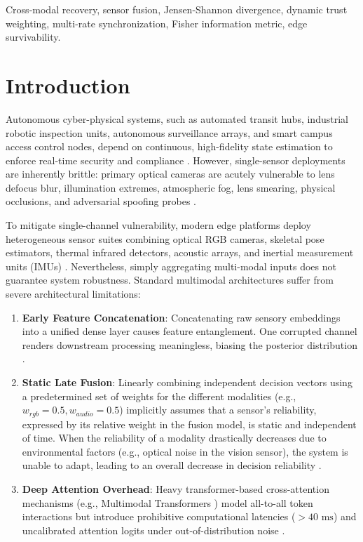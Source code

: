 \documentclass[conference]{IEEEtran}
\begin{document}
\begin{IEEEkeywords}
Cross-modal recovery, sensor fusion, Jensen-Shannon divergence, dynamic trust weighting, multi-rate synchronization, Fisher information metric, edge survivability.
\end{IEEEkeywords}

\section{Introduction}
Autonomous cyber-physical systems, such as automated transit hubs, industrial robotic inspection units, autonomous surveillance arrays, and smart campus access control nodes, depend on continuous, high-fidelity state estimation to enforce real-time security and compliance \cite{baltrusaitis2018multimodal, ramachandram2017deep}. However, single-sensor deployments are inherently brittle: primary optical cameras are acutely vulnerable to lens defocus blur, illumination extremes, atmospheric fog, lens smearing, physical occlusions, and adversarial spoofing probes \cite{dodge2016understanding, hendrycks2019benchmarking}.

To mitigate single-channel vulnerability, modern edge platforms deploy heterogeneous sensor suites combining optical RGB cameras, skeletal pose estimators, thermal infrared detectors, acoustic arrays, and inertial measurement units (IMUs) \cite{khaleghi2013multisensor}. Nevertheless, simply aggregating multi-modal inputs does not guarantee system robustness. Standard multimodal architectures suffer from severe architectural limitations:
\begin{enumerate}
    \item \textbf{Early Feature Concatenation}: Concatenating raw sensory embeddings into a unified dense layer causes feature entanglement. One corrupted channel renders downstream processing meaningless, biasing the posterior distribution \cite{baltrusaitis2018multimodal}.
    \item \textbf{Static Late Fusion}: Linearly combining independent decision vectors using a predetermined set of weights for the different modalities (e.g., $w_{rgb} = 0.5, w_{audio} = 0.5$) implicitly assumes that a sensor's reliability, expressed by its relative weight in the fusion model, is static and independent of time. When the reliability of a modality drastically decreases due to environmental factors (e.g., optical noise in the vision sensor), the system is unable to adapt, leading to an overall decrease in decision reliability \cite{tsai2019multimodal}.
    \item \textbf{Deep Attention Overhead}: Heavy transformer-based cross-attention mechanisms (e.g., Multimodal Transformers \cite{tsai2019multimodal}) model all-to-all token interactions but introduce prohibitive computational latencies ($>40\text{ ms}$) and uncalibrated attention logits under out-of-distribution noise \cite{guo2017calibration}.
\end{enumerate}
\end{document}
